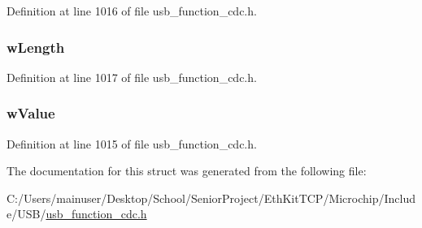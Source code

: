 Definition at line 1016 of file usb\+\_\+function\+\_\+cdc.\+h.

\hypertarget{struct_s_e_r_i_a_l___s_t_a_t_e___n_o_t_i_f_i_c_a_t_i_o_n_a68c8a688e189c3ef3c333604d8914433}{}
\subsubsection[{w\+Length}]{ w\+Length}\label{struct_s_e_r_i_a_l___s_t_a_t_e___n_o_t_i_f_i_c_a_t_i_o_n_a68c8a688e189c3ef3c333604d8914433}


Definition at line 1017 of file usb\+\_\+function\+\_\+cdc.\+h.

\hypertarget{struct_s_e_r_i_a_l___s_t_a_t_e___n_o_t_i_f_i_c_a_t_i_o_n_a7e99ff5607397c6492e3e2b22367ec4b}{}
\subsubsection[{w\+Value}]{ w\+Value}\label{struct_s_e_r_i_a_l___s_t_a_t_e___n_o_t_i_f_i_c_a_t_i_o_n_a7e99ff5607397c6492e3e2b22367ec4b}


Definition at line 1015 of file usb\+\_\+function\+\_\+cdc.\+h.



The documentation for this struct was generated from the following file\+:\begin{DoxyCompactItemize}
\item 
C\+:/\+Users/mainuser/\+Desktop/\+School/\+Senior\+Project/\+Eth\+Kit\+T\+C\+P/\+Microchip/\+Include/\+U\+S\+B/\hyperlink{usb__function__cdc_8h}{usb\+\_\+function\+\_\+cdc.\+h}\end{DoxyCompactItemize}
